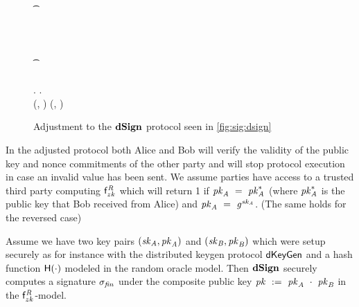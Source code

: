 \begin{figure}
\begin{center}
{\begin{varwidth}{\textwidth}
{            \pcif \procVerfPtSig{\varSigBob}{\varMsg}{\varPubKeyBob}  \< \< \\
            \t \pcreturn \cnstFalsum \< \< \\
            \varSigAlice \opFunResult \procSignPrt{\varMsg}{\varSecKeyAlice}{\varNonceAlice}{\varSigContext} \< \< \\
            \< \sendmessageright*{\varSigAlice} \< \\
            \< \< \pcif \procVerfPtSig{\varSigAlice}{\varMsg}{\varPubKeyAlice}  \\
            \< \< \t \pcreturn \cnstFalsum \\
            \varSigFin \opFunResult \procFinSig{\varSigAlice}{\varSigBob} \< \< \varSigFin \opFunResult \procFinSig{\varSigAlice}{\varSigBob} \\
            \varPubKey \opFunResult \varSigContext.\varPubKey \< \< \varPubKey \opFunResult \varSigContext.\varPubKey \\
            \pcreturn (\varSigFin, \varPubKey) \< \< \pcreturn (\varSigFin, \varPubKey)
            }
        \end{varwidth}
        }
    \end{center}
    \caption{Adjustment to the $\mathbf{dSign}$ protocol seen in \cref{fig:sig:dsign}} \label{fig:sig:dsign-adj}
\end{figure}


In the adjusted protocol both Alice and Bob will verify the validity of the public key and nonce commitments of the other party and will stop protocol execution in case an invalid value has been sent.
We assume parties have access to a trusted third party computing $\mathsf{f}^{\mathit{R}}_{zk}$ which will return 1 if $\mathit{pk}_{\mathit{A}} ~=~ \mathit{pk}_{\mathit{A}}^*$ (where $\mathit{pk}_{\mathit{A}}^*$ is the public key that Bob received from Alice) and $\mathit{pk}_{\mathit{A}} ~=~ \mathit{g}^{\mathit{sk}_{\mathit{A}}}$. (The same holds for the reversed case)

\begin{theorem}\label{lem:sig:dsign}
Assume we have two key pairs $(\mathit{sk}_{\mathit{A}}, \mathit{pk}_{\mathit{A}})$ and $(\mathit{sk}_{\mathit{B}}, \mathit{pk}_{\mathit{B}})$ which were setup securely as for instance with the distributed keygen protocol $\mathsf{dKeyGen}$ and a hash function $\mathsf{H} (\cdot)$ modeled in the random oracle model.
    Then $\mathbf{dSign}$ securely computes a signature $\sigma_{\mathit{fin}}$ under the composite public key $\mathit{pk} ~:=~ \mathit{pk}_{\mathit{A}} ~\cdot~ \mathit{pk}_{\mathit{B}}$ in the $\mathsf{f}^{\mathit{R}}_{zk}$-model.
\end{theorem}

